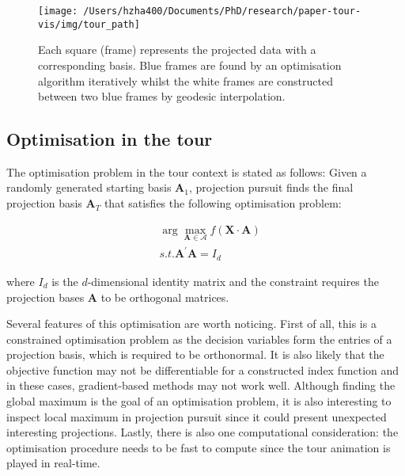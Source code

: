 \begin{Schunk}
\begin{figure}

{\centering \texttt{[image: /Users/hzha400/Documents/PhD/research/paper-tour-vis/img/tour\_path]} 

}

\caption[Each square (frame) represents the projected data with a corresponding basis]{Each square (frame) represents the projected data with a corresponding basis. Blue frames are found by an optimisation algorithm iteratively whilst the white frames are constructed between two blue frames by geodesic interpolation.}\label{fig:tour-path}
\end{figure}
\end{Schunk}

\hypertarget{tour-optim}{%
\subsection{Optimisation in the tour}\label{tour-optim}}

The optimisation problem in the tour context is stated as follows: Given
a randomly generated starting basis \(\mathbf{A}_1\), projection pursuit
finds the final projection basis \(\mathbf{A}_T\) that satisfies the
following optimisation problem:

\begin{align}
&\arg \max_{\mathbf{A} \in \mathcal{A}} f(\mathbf{X} \cdot \mathbf{A}) \\
&s.t.  \mathbf{A}^{\prime} \mathbf{A} = I_d
\end{align}

\noindent where \(I_d\) is the \(d\)-dimensional identity matrix and the
constraint requires the projection bases \(\mathbf{A}\) to be orthogonal
matrices.

Several features of this optimisation are worth noticing. First of all,
this is a constrained optimisation problem as the decision variables
form the entries of a projection basis, which is required to be
orthonormal. It is also likely that the objective function may not be
differentiable for a constructed index function and in these cases,
gradient-based methods may not work well. Although finding the global
maximum is the goal of an optimisation problem, it is also interesting
to inspect local maximum in projection pursuit since it could present
unexpected interesting projections. Lastly, there is also one
computational consideration: the optimisation procedure needs to be fast
to compute since the tour animation is played in real-time.

